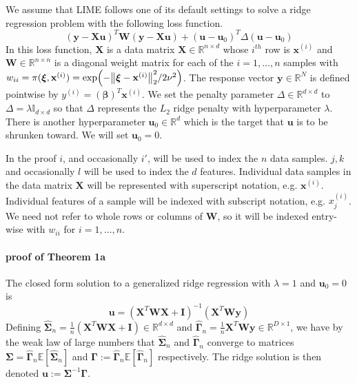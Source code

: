 \documentclass[mnsc,blindrev]{informs3}
\begin{document}
        We assume that LIME follows one of its default settings to solve a ridge regression problem with the following loss function.
        \begin{equation*}
            (\mathbf{y} - \mathbf{X}\mathbf{u})^T \mathbf{W}(\mathbf{y} - \mathbf{X}\mathbf{u}) + (\mathbf{u} - \mathbf{u}_0)^T \Delta(\mathbf{u} - \mathbf{u}_0)
        \end{equation*}
        In this loss function, $\mathbf{X}$ is a data matrix $\mathbf{X} \in \mathbb{R}^{n\times d}$ whose $i^{th}$ row is $\mathbf{x}^{(i)}$ and $\mathbf{W} \in \mathbb{R}^{n\times n}$ is a diagonal weight matrix for each of the $i=1,\ldots,n$ samples with $w_{ii} = \pi(\boldsymbol{\xi},\mathbf{x}^{(i)}) = \exp(-\norm{\boldsymbol{\xi} - \mathbf{x}^{(i)}}_2^2/2\nu^2)$. The response vector $\mathbf{y}\in \mathbb{R}^N$ is defined pointwise by $y^{(i)} = (\boldsymbol{\beta})^T \mathbf{x}^{(i)}$. We set the penalty parameter $\Delta\in \mathbb{R}^{d\times d}$ to $\Delta = \lambda \mathds{I}_{d\times d}$ so that $\Delta$ represents the $L_2$ ridge penalty with hyperparameter $\lambda$. There is another hyperparameter $\mathbf{u}_0 \in \mathbb{R}^d$ which is the target that $\mathbf{u}$ is to be shrunken toward.  We will set $\mathbf{u}_0 = 0$.

        In the proof $i$, and occasionally $i'$, will be used to index the $n$ data samples. $j,k$ and occasionally $l$ will be used to index the $d$ features. Individual data samples in the data matrix $\mathbf{X}$ will be represented with superscript notation, e.g. $\mathbf{x}^{(i)}$. Individual features of a sample will be indexed with subscript notation, e.g. $x^{(i)}_j$. We need not refer to whole rows or columns of $\mathbf{W}$, so it will be indexed entry-wise with $w_{ii}$ for $i=1,\ldots,n$.
    
    
        \paragraph{proof of Theorem 1a}
            The closed form solution to a generalized ridge regression with $\lambda = 1$ and $\mathbf{u}_0 = 0$ is
            \begin{equation*}
                \mathbf{u} = (\mathbf{X}^T \mathbf{W} \mathbf{X} + \mathbf{I})^{-1}(\mathbf{X}^T\mathbf{W}\mathbf{y})%
            \end{equation*}
                Defining $\hat{\mathbf{\Sigma}}_n = \frac{1}{n}(\mathbf{X}^T \mathbf{W} \mathbf{X} +  \mathbf{I}) \in \mathbb{R}^{d\times d}$ and $\hat{\mathbf{\Gamma}}_n = \frac{1}{n}\mathbf{X}^T \mathbf{W}\mathbf{y}\in \mathbb{R}^{D \times 1}$, we have by the weak law of large numbers that $\hat{\mathbf{\Sigma}}_n$ and  $\hat{\mathbf{\Gamma}}_n$ converge to matrices $\mathbf{\Sigma}=\hat{\mathbf{\Gamma}}_n \mathds{E}[\hat{\mathbf{\Sigma}}_n]$ and $\mathbf{\Gamma}:=\hat{\mathbf{\Gamma}}_n \mathds{E}[\hat{\mathbf{\Gamma}}_n]$ respectively.
                The ridge solution is then denoted $\mathbf{u} := \mathbf{\Sigma}^{-1}\mathbf{\Gamma}$. 
                
\end{document}

